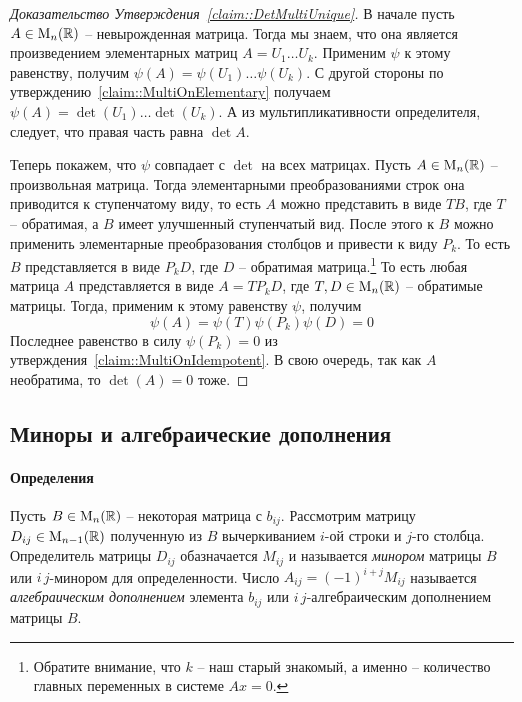 \begin{proof}[Доказательство Утверждения~\ref{claim::DetMultiUnique}]
В начале пусть $A\in\operatorname{M}_{n}(\mathbb R)$ -- невырожденная матрица. Тогда мы знаем, что она является произведением элементарных матриц $A = U_1\ldots U_k$. Применим $\psi$ к этому равенству, получим $\psi(A) = \psi(U_1)\ldots \psi(U_k)$. С другой стороны по утверждению~\ref{claim::MultiOnElementary} получаем $\psi(A) = \det(U_1)\ldots \det(U_k)$. А из мультипликативности определителя, следует, что правая часть равна $\det A$.

Теперь покажем, что $\psi$ совпадает с $\det$ на всех матрицах. Пусть $A\in\operatorname{M}_{n}(\mathbb R)$ -- произвольная матрица. Тогда элементарными преобразованиями строк она приводится к ступенчатому виду, то есть $A$ можно представить в виде $TB$, где $T$ -- обратимая, а $B$ имеет улучшенный ступенчатый вид. После этого к $B$ можно применить элементарные преобразования столбцов и привести к виду $P_k$. То есть $B$ представляется в виде $P_k D$, где $D$ -- обратимая матрица.\footnote{Обратите внимание, что $k$ -- наш старый знакомый, а именно -- количество главных переменных в системе $Ax = 0$.} То есть любая матрица $A$ представляется в виде $A = T P_k D$, где $T,D\in\operatorname{M}_{n}(\mathbb R)$ -- обратимые матрицы. Тогда, применим к этому равенству $\psi$, получим
\[
\psi(A) = \psi(T)\psi(P_k)\psi(D) = 0
\]
Последнее равенство в силу $\psi(P_k) = 0$ из утверждения~\ref{claim::MultiOnIdempotent}. В свою очередь, так как $A$ необратима, то $\det(A) = 0$ тоже.
\end{proof}


\subsection{Миноры и алгебраические дополнения}

\paragraph{Определения}

Пусть $B\in\operatorname{M}_{n}(\mathbb R)$ -- некоторая матрица с $b_{ij}$. Рассмотрим матрицу $D_{ij}\in\operatorname{M}_{n-1}(\mathbb R)$ полученную из $B$ вычеркиванием $i$-ой строки и $j$-го столбца. Определитель матрицы $D_{ij}$ обазначается $M_{ij}$ и называется {\it минором} матрицы $B$ или $i\,j$-минором для определенности. Число $A_{ij} = (-1)^{i+j}M_{ij}$ называется {\it алгебраическим дополнением} элемента $b_{ij}$ или $i\,j$-алгебраическим дополнением матрицы $B$.

